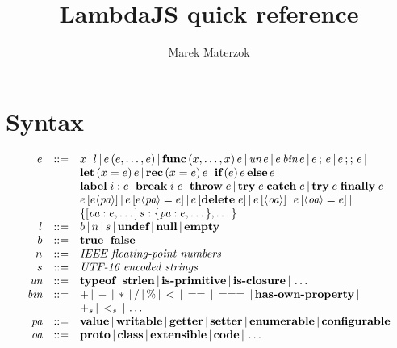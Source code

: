 \documentclass[draft]{article}
\title{LambdaJS quick reference}
\author{Marek Materzok}
\newcommand{\expr}[0]{e}
\newcommand{\var}[0]{x}
\newcommand{\lit}[0]{l}
\newcommand{\bool}[0]{b}
\newcommand{\num}[0]{n}
\newcommand{\str}[0]{s}
\newcommand{\id}[0]{i}
\newcommand{\undef}[0]{\textbf{undef}}
\newcommand{\nul}[0]{\textbf{null}}
\newcommand{\empt}[0]{\textbf{empty}}
\newcommand{\true}[0]{\textbf{true}}
\newcommand{\false}[0]{\textbf{false}}
\newcommand{\unop}[0]{\textit{un}}
\newcommand{\binop}[0]{\textit{bin}}
\newcommand{\pattr}[0]{\textit{pa}}
\newcommand{\oattr}[0]{\textit{oa}}
\newcommand{\pavalue}[0]{\textbf{value}}
\newcommand{\pawritable}[0]{\textbf{writable}}
\newcommand{\paget}[0]{\textbf{getter}}
\newcommand{\paset}[0]{\textbf{setter}}
\newcommand{\paenum}[0]{\textbf{enumerable}}
\newcommand{\paconfig}[0]{\textbf{configurable}}
\newcommand{\oaproto}[0]{\textbf{proto}}
\newcommand{\oaclass}[0]{\textbf{class}}
\newcommand{\oaextens}[0]{\textbf{extensible}}
\newcommand{\oacode}[0]{\textbf{code}}
\newcommand{\unap}[1]{\unop \thinspace #1}
\newcommand{\binap}[2]{#1 \thinspace \binop \thinspace #2}
\newcommand{\ap}[2]{#1\thinspace(#2)}
\newcommand{\func}[2]{\textbf{func}\thinspace(#1)\thinspace #2}
\newcommand{\seq}[2]{#1 \thinspace ; \thinspace #2}
\newcommand{\jseq}[2]{#1 \thinspace ;; \thinspace #2}
\newcommand{\letdef}[3]{\textbf{let} \thinspace (#1 = #2) \thinspace #3}
\newcommand{\recdef}[3]{\textbf{rec} \thinspace (#1 = #2) \thinspace #3}
\newcommand{\ife}[3]{\textbf{if} \thinspace (#1) \thinspace #2 \thinspace \textbf{else} \thinspace #3}
\newcommand{\lbl}[2]{\textbf{label} \thickspace #1: #2}
\newcommand{\brk}[2]{\textbf{break} \thickspace #1 \thickspace #2}
\newcommand{\throw}[1]{\textbf{throw} \thickspace #1}
\newcommand{\trycatch}[2]{\textbf{try} \thickspace #1 \thickspace \textbf{catch} \thickspace #2}
\newcommand{\tryfin}[2]{\textbf{try} \thickspace #1 \thickspace \textbf{finally} \thickspace #2}
\newcommand{\getattr}[3]{#2 \thinspace [ #3 \langle #1 \rangle ] }
\newcommand{\setattr}[4]{#2 \thinspace [ #3 \langle #1 \rangle = #4 ] }
\newcommand{\delattr}[2]{#1 \thinspace [ \textbf{delete} \thickspace #2 ]}
\newcommand{\getoattr}[2]{#2 \thinspace [ \langle #1 \rangle ]}
\newcommand{\setoattr}[3]{#2 \thinspace [ \langle #1 \rangle = #3 ]}
\newcommand{\bnfsep}[0]{\thinspace | \thinspace}
\newcommand{\optypeof}[0]{\textbf{typeof}}
\newcommand{\opstrlen}[0]{\textbf{strlen}}
\newcommand{\opisprim}[0]{\textbf{is-primitive}}
\newcommand{\opisclosure}[0]{\textbf{is-closure}}
\newcommand{\ophasprop}[0]{\textbf{has-own-property}}
\newcommand{\opstrplus}[0]{+_{\str}}
\newcommand{\opstrlt}[0]{<_{\str}}
\begin{document}
\maketitle

\section{Syntax}

\[
\begin{array}{rcl}
\expr & ::= & \var \bnfsep \lit \bnfsep \ap{\expr}{\expr, \dots, \expr} \bnfsep
              \func{\var, \dots, \var}{\expr} \bnfsep
              \unap{\expr} \bnfsep \binap{\expr}{\expr} \bnfsep
              \seq{\expr}{\expr} \bnfsep \jseq{\expr}{\expr} \bnfsep \\
          & & \letdef{\var}{\expr}{\expr} \bnfsep \recdef{\var}{\expr}{\expr} \bnfsep
              \ife{\expr}{\expr}{\expr} \bnfsep \\
          & & \lbl{\id}{\expr} \bnfsep \brk{\id}{\expr} \bnfsep
              \throw{\expr} \bnfsep \trycatch{\expr}{\expr} \bnfsep \tryfin{\expr}{\expr} \bnfsep \\
          & & \getattr{\pattr}{\expr}{\expr} \bnfsep \setattr{\pattr}{\expr}{\expr}{\expr} \bnfsep
              \delattr{\expr}{\expr} \bnfsep \getoattr{\oattr}{\expr} \bnfsep 
              \setoattr{\oattr}{\expr}{\expr} \bnfsep \\
          & & \{[\oattr: \expr, \dots] \thinspace \str : \{\pattr : \expr, \dots\}, \dots \} \\
\lit & ::= & \bool \bnfsep \num \bnfsep \str \bnfsep \undef \bnfsep \nul \bnfsep \empt \\
\bool & ::= & \true \bnfsep \false \\
\num & ::= & \textit{IEEE floating-point numbers} \\
\str & ::= & \textit{UTF-16 encoded strings} \\
\unop & ::= & \optypeof \bnfsep \opstrlen \bnfsep \opisprim \bnfsep \opisclosure \bnfsep \dots \\
\binop & ::= & + \bnfsep - \bnfsep * \bnfsep / \bnfsep \% \bnfsep < \bnfsep == \bnfsep === \bnfsep 
               \ophasprop \bnfsep \\
           & & \opstrplus \bnfsep \opstrlt \bnfsep \dots \\
\pattr & ::= & \pavalue \bnfsep \pawritable \bnfsep \paget \bnfsep \paset \bnfsep
               \paenum \bnfsep \paconfig \\
\oattr & ::= & \oaproto \bnfsep \oaclass \bnfsep \oaextens \bnfsep \oacode \bnfsep \dots
\end{array}
\]
\end{document}
